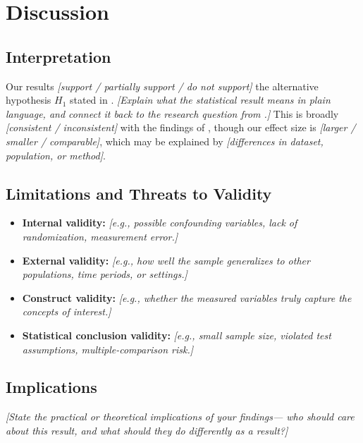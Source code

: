 \section{Discussion}
\label{S:discussion}


\subsection{Interpretation}

Our results \textit{[support / partially support / do not support]} the alternative hypothesis $H_1$ stated in . \textit{[Explain what the statistical result means in plain language, and connect it back to the research question from .]} This is broadly \textit{[consistent / inconsistent]} with the findings of \citet{smith2020}, though our effect size is \textit{[larger / smaller / comparable]}, which may be explained by \textit{[differences in dataset, population, or method]}.

\subsection{Limitations and Threats to Validity}

\begin{itemize}
    \item \textbf{Internal validity:} \textit{[e.g., possible confounding variables, lack of randomization, measurement error.]}
    \item \textbf{External validity:} \textit{[e.g., how well the sample generalizes to other populations, time periods, or settings.]}
    \item \textbf{Construct validity:} \textit{[e.g., whether the measured variables truly capture the concepts of interest.]}
    \item \textbf{Statistical conclusion validity:} \textit{[e.g., small sample size, violated test assumptions, multiple-comparison risk.]}
\end{itemize}

\subsection{Implications}

\textit{[State the practical or theoretical implications of your findings— who should care about this result, and what should they do differently as a result?]}